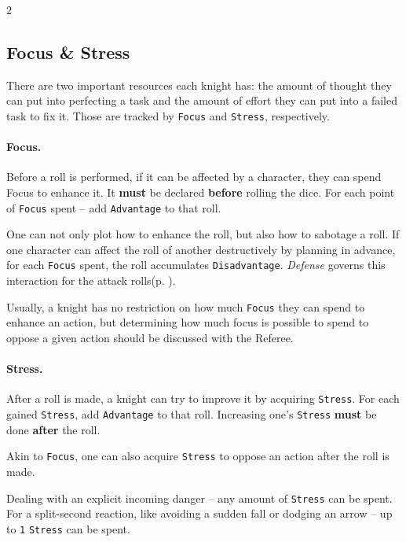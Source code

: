 

\begin{multicols*}{2}
\label{sec:basic}

\subsection*{Focus \& Stress}

There are two important resources each knight has:
the amount of thought they can put into perfecting a task and the amount of effort they can put into a failed task to fix it.
Those are tracked by \texttt{Focus} and \texttt{Stress}, respectively.

\paragraph{Focus.} Before a roll is performed, if it can be affected by a character, they can spend Focus to
enhance it. It \textbf{must} be declared \textbf{before} rolling the dice. For each point of \texttt{Focus} spent -- add \texttt{Advantage} to that roll.

One can not only plot how to enhance the roll, but also how to sabotage a roll.
If one character can affect the roll of another destructively by planning in advance, for each \texttt{Focus} spent, the roll accumulates \texttt{Disadvantage}.
\emph{Defense} governs this interaction for the attack rolls(p. \pageref*{sec:combat}).

Usually, a knight has no restriction on how much \texttt{Focus} they can spend to enhance an action, but
determining how much focus is possible to spend to oppose a given action should be discussed with the Referee. 

\paragraph{Stress.} After a roll is made, a knight can try to improve it by acquiring \texttt{Stress}.
For each gained \texttt{Stress}, add \texttt{Advantage} to that roll. Increasing one's \texttt{Stress} \textbf{must} be done \textbf{after} the roll.

Akin to \texttt{Focus}, one can also acquire \texttt{Stress} to oppose an action after the roll is made.

Dealing with an explicit incoming danger -- any amount of \texttt{Stress} can be spent.
For a split-second reaction, like avoiding a sudden fall or dodging an arrow -- up to \texttt{1} \texttt{Stress} can be spent.


\end{multicols*}
